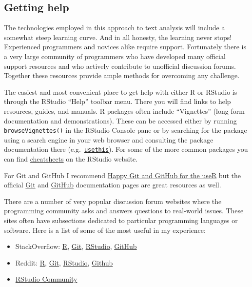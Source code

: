 \documentclass[
  letterpaper,
]{latex/krantz}
\providecommand{\tightlist}{%
  \setlength{\itemsep}{0pt}\setlength{\parskip}{0pt}}\usepackage{longtable,booktabs,array}
\begin{document}
\hypertarget{getting-help}{%
\subsection*{Getting help}\label{getting-help}}

The technologies employed in this approach to text analysis will include
a somewhat steep learning curve. And in all honesty, the learning never
stops! Experienced programmers and novices alike require support.
Fortunately there is a very large community of programmers who have
developed many official support resources and who actively contribute to
unofficial discussion forums. Together these resources provide ample
methods for overcoming any challenge.

The easiest and most convenient place to get help with either R or
RStudio is through the RStudio ``Help'' toolbar menu. There you will
find links to help resources, guides, and manuals. R packages often
include ``Vignettes'' (long-form documentation and demonstrations).
These can be accessed either by running \texttt{browseVignettes()} in
the RStudio Console pane or by searching for the package using a search
engine in your web browser and consulting the package documentation
there (e.g.~\href{https://usethis.r-lib.org/}{\texttt{usethis}}). For
some of the more common packages you can find
\href{https://www.rstudio.com/resources/cheatsheets/}{cheatsheets} on
the RStudio website.

For Git and GitHub I recommend \href{https://happygitwithr.com/}{Happy
Git and GitHub for the useR} but the official
\href{https://git-scm.com/doc}{Git} and
\href{https://docs.github.com/en}{GitHub} documentation pages are great
resources as well.

There are a number of very popular discussion forum websites where the
programming community asks and answers questions to real-world issues.
These sites often have subsections dedicated to particular programming
languages or software. Here is a list of some of the most useful in my
experience:

\begin{itemize}
\tightlist
\item
  StackOverflow: \href{https://stackoverflow.com/questions/tagged/r}{R},
  \href{https://stackoverflow.com/questions/tagged/git}{Git},
  \href{https://stackoverflow.com/questions/tagged/rstudio}{RStudio},
  \href{https://stackoverflow.com/questions/tagged/github}{GitHub}
\item
  Reddit: \href{https://www.reddit.com/r/rstats/}{R},
  \href{https://www.reddit.com/r/git/}{Git},
  \href{https://www.reddit.com/r/RStudio/}{RStudio},
  \href{https://www.reddit.com/r/github/}{Github}
\item
  \href{https://community.rstudio.com/}{RStudio Community}
\end{itemize}
\end{document}
